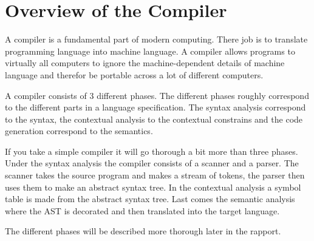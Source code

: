 \section{Overview of the Compiler}


A compiler is a fundamental part of modern computing. There job is to translate programming language into machine language. A compiler allows programs to virtually all computers to ignore the machine-dependent details of machine language and therefor be portable across a lot of different computers.  \citep{CraftingACompiler}


A compiler consists of 3 different phases. The different phases roughly correspond to the different parts in a language specification. The syntax analysis correspond to the syntax, the contextual analysis to the contextual constrains and the code generation correspond to the semantics.


If you take a simple compiler it will go thorough a bit more than three phases. Under the syntax analysis the compiler consists of a scanner and a parser. The scanner takes the source program and makes a stream of tokens, the parser then uses them to make an abstract syntax tree. In the contextual analysis a symbol table is made from the abstract syntax tree. Last comes the semantic analysis where the AST is decorated and then translated into the target language.

The different phases will be described more thorough later in the rapport. 

